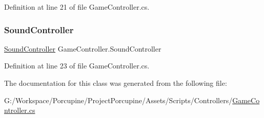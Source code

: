 Definition at line 21 of file Game\+Controller.\+cs.

\mbox{\label{class_game_controller_a1a047c3e2b0dd35810c7332008384bc6}} 
\subsubsection{\texorpdfstring{Sound\+Controller}{SoundController}}
{\footnotesize\ttfamily \hyperlink{class_sound_controller}{Sound\+Controller} Game\+Controller.\+Sound\+Controller\hspace{0.3cm}{\ttfamily [get]}}



Definition at line 23 of file Game\+Controller.\+cs.



The documentation for this class was generated from the following file\+:\begin{DoxyCompactItemize}
\item 
G\+:/\+Workspace/\+Porcupine/\+Project\+Porcupine/\+Assets/\+Scripts/\+Controllers/\hyperlink{_game_controller_8cs}{Game\+Controller.\+cs}\end{DoxyCompactItemize}
